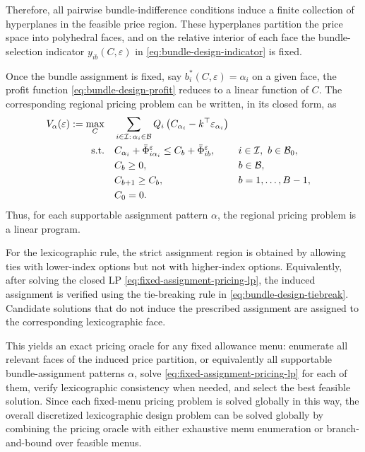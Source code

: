 \documentclass{article}
\newcommand{\setB}{\mathcal{B}}
\newcommand{\setI}{\mathcal{I}}
\begin{document}
Therefore, all pairwise bundle-indifference conditions induce a finite collection of
hyperplanes in the feasible price region. These hyperplanes partition the price space
into polyhedral faces, and on the relative interior of each face the bundle-selection
indicator \(y_{ib}(C,\varepsilon)\) in \eqref{eq:bundle-design-indicator} is fixed.

Once the bundle assignment is fixed, say \(b_i^*(C,\varepsilon)=\alpha_i\) on a
given face, the profit function \eqref{eq:bundle-design-profit} reduces to a linear
function of \(C\). The corresponding regional pricing problem can be written, in its
closed form, as
\begin{align}
V_{\alpha}(\varepsilon)
:=
\max_{C}\quad
&
\sum_{i\in\setI:\,\alpha_i\in\setB}
Q_i
\left(C_{\alpha_i}-k^\top\varepsilon_{\alpha_i}\right)
\label{eq:fixed-assignment-pricing-lp}
\\
\text{s.t.}\quad
&
C_{\alpha_i}+\bar\Phi_{i\alpha_i}^{\varepsilon}
\le
C_b+\bar\Phi_{ib}^{\varepsilon},
&& i\in\setI,\ b\in\setB_0,
\notag
\\
&
C_b\ge 0,
&& b\in\setB,
\notag
\\
&
C_{b+1}\ge C_b,
&& b=1,\dots,B-1,
\notag
\\
&
C_0=0.
\notag
\end{align}
Thus, for each supportable assignment pattern \(\alpha\), the regional pricing
problem is a linear program.

For the lexicographic rule, the strict assignment region is obtained by allowing
ties with lower-index options but not with higher-index options. Equivalently, after
solving the closed LP \eqref{eq:fixed-assignment-pricing-lp}, the induced assignment is
verified using the tie-breaking rule in \eqref{eq:bundle-design-tiebreak}. Candidate
solutions that do not induce the prescribed assignment are assigned to the corresponding
lexicographic face.

This yields an exact pricing oracle for any fixed allowance menu: enumerate all relevant
faces of the induced price partition, or equivalently all supportable bundle-assignment
patterns \(\alpha\), solve \eqref{eq:fixed-assignment-pricing-lp} for each of them, verify
lexicographic consistency when needed, and select the best feasible solution. Since each
fixed-menu pricing problem is solved globally in this way, the overall discretized
lexicographic design problem can be solved globally by combining the pricing oracle
with either exhaustive menu enumeration or branch-and-bound over feasible menus.
\end{document}
